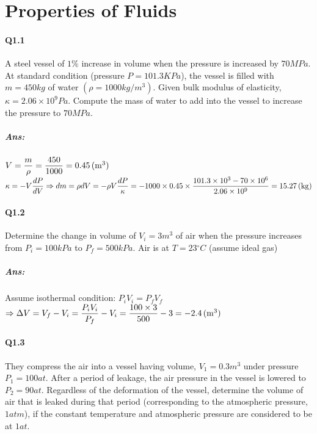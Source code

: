 \chapter{Properties of Fluids}

\subsubsection{Q1.1}
A steel vessel of $ 1\% $ increase in volume when the pressure is increased by $ 70 \unit{MPa} $. At standard
condition (pressure $ P = 101.3 \unit{KPa} $), the vessel is filled with $m= 450 \unit{kg} $ of water $ (\rho=1000\unit{kg/m^3}) $. Given bulk modulus of elasticity, $ \kappa= 2.06\times10^9 \unit{Pa} $. Compute the mass of water to add into the vessel to increase the pressure to $ 70\unit{MPa} $.
\paragraph{Ans:}$ $\\
$ V = \dfrac{m}{\rho} = \dfrac{450}{1000} = 0.45\, (\mathrm{m^3})$\\
$ \kappa=-V\dfrac{dP}{dV}\\
 \Rightarrow dm = \rho dV = -\rho V\dfrac{dP}{\kappa} \\ =-1000\times0.45\times\dfrac{101.3\times10^3-70\times10^6}{2.06\times10^9}=15.27\, (\mathrm{kg})$

\subsubsection{Q1.2}
Determine the change in volume of $ V_i=3\unit{m^3} $ of air when the pressure increases from $ P_i=100\unit{kPa} $ to $P_f= 500\unit{kPa} $. Air is at $ T=23\unit{^\circ C} $ (assume ideal gas)
\paragraph{Ans:}$ $\\
Assume isothermal condition: $ P_iV_i=P_fV_f $\\
$ \Rightarrow \Delta V = V_f - V_i = \dfrac{P_iV_i}{P_f} - V_i =\dfrac{100\times3}{500} - 3 = -2.4\, (\mathrm{m^3})$
\subsubsection{Q1.3}
They compress the air into a vessel having volume, $ V_1 = 0.3 \unit{m^3} $ under pressure $ P_1 = 100 \unit{at} $. After a period of leakage, the air pressure in the vessel is lowered to $ P_2 = 90 \unit{at} $. Regardless of the deformation of the vessel, determine the volume of air that is leaked during that period (corresponding to the atmospheric pressure, $1 \unit{atm} $), if the constant temperature and atmospheric pressure are considered to be at $ 1\unit{at} $.
